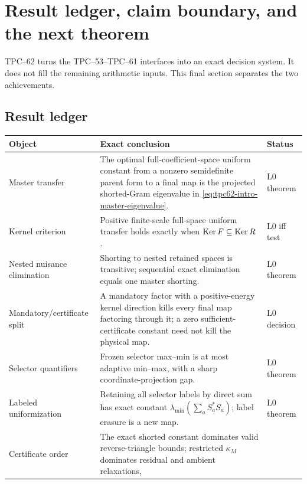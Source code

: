 \section{Result ledger, claim boundary, and the next theorem}
\label{sec:tpc62-claims-next}

TPC--62 turns the TPC--53--TPC--61 interfaces into an exact decision system.
It does not fill the remaining arithmetic inputs.  This final section
separates the two achievements.

\subsection{Result ledger}

\begin{center}
\small
\begin{tabular}{>{\raggedright\arraybackslash}p{}
                >{\raggedright\arraybackslash}p{}
                >{\raggedright\arraybackslash}p{}}
\toprule
Object & Exact conclusion & Status\\
\midrule
Master transfer
& The optimal full-coefficient-space uniform constant from a nonzero
  semidefinite parent form to a final map is the projected shorted-Gram eigenvalue in
  \eqref{eq:tpc62-intro-master-eigenvalue}.
& L0 theorem\\
\addlinespace
Kernel criterion
& Positive finite-scale full-space uniform transfer holds exactly when
  \(\operatorname{Ker} F\subseteq\operatorname{Ker} R\).
& L0 iff test\\
\addlinespace
Nested nuisance elimination
& Shorting to nested retained spaces is transitive; sequential exact
  elimination equals one master shorting.
& L0 theorem\\
\addlinespace
Mandatory/certificate split
& A mandatory factor with a positive-energy kernel direction kills every
  final map factoring through it; a zero sufficient-certificate constant
  need not kill the physical map.
& L0 decision\\
\addlinespace
Selector quantifiers
& Frozen selector max--min is at most adaptive min--max, with a sharp
  coordinate-projection gap.
& L0 theorem\\
\addlinespace
Labeled uniformization
& Retaining all selector labels by direct sum has exact constant
  \(\lambda_{\min}(\sum_aS_a^*S_a)\); label erasure is a new map.
& L0 theorem\\
\addlinespace
Certificate order
& The exact shorted constant dominates valid reverse-triangle bounds;
  restricted \(\kappa_M\) dominates residual and ambient relaxations,

\end{tabular}
\end{center}
